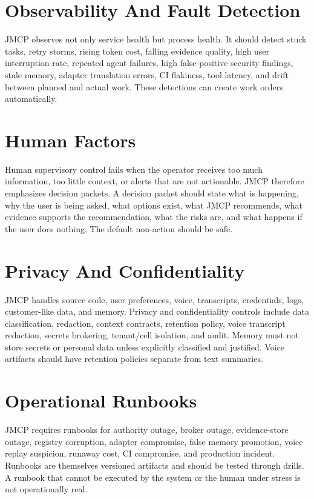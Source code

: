 \documentclass[10pt,journal,onecolumn]{IEEEtran}
\begin{document}
\section{Observability And Fault Detection}
JMCP observes not only service health but process health. It should detect stuck tasks, retry storms, rising token cost, falling evidence quality, high user interruption rate, repeated agent failures, high false-positive security findings, stale memory, adapter translation errors, CI flakiness, tool latency, and drift between planned and actual work. These detections can create work orders automatically.

\section{Human Factors}
Human supervisory control fails when the operator receives too much information, too little context, or alerts that are not actionable. JMCP therefore emphasizes decision packets. A decision packet should state what is happening, why the user is being asked, what options exist, what JMCP recommends, what evidence supports the recommendation, what the risks are, and what happens if the user does nothing. The default non-action should be safe.

\section{Privacy And Confidentiality}
JMCP handles source code, user preferences, voice, transcripts, credentials, logs, customer-like data, and memory. Privacy and confidentiality controls include data classification, redaction, context contracts, retention policy, voice transcript redaction, secrets brokering, tenant/cell isolation, and audit. Memory must not store secrets or personal data unless explicitly classified and justified. Voice artifacts should have retention policies separate from text summaries.

\section{Operational Runbooks}
JMCP requires runbooks for authority outage, broker outage, evidence-store outage, registry corruption, adapter compromise, false memory promotion, voice replay suspicion, runaway cost, CI compromise, and production incident. Runbooks are themselves versioned artifacts and should be tested through drills. A runbook that cannot be executed by the system or the human under stress is not operationally real.
\end{document}
